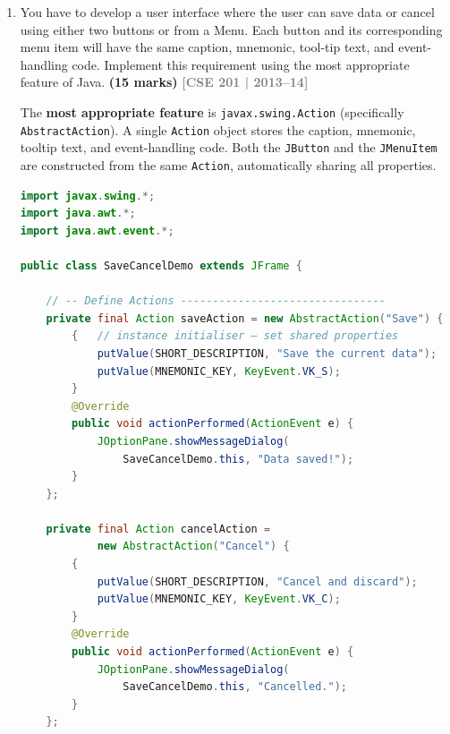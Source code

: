 \documentclass[12pt,a3paper]{article}
\newcommand{\yr}[1]{\hfill\textcolor{gray}{\small\textbf{[#1]}}}
\newcommand{\mk}[1]{\textcolor{orange!70!black}{\small\textbf{(#1 marks)}}}
\begin{document}
\begin{enumerate}
\begin{tcolorbox}[enhanced,breakable,ansbox,
  colback=cC!4,colframe=cC,boxrule=0.8pt,arc=5pt,
  title={\textbf{Answer — Improvements of Swing Over
  AWT}},
  fonttitle=\bfseries\color{white},colbacktitle=cC]
\begin{enumerate}[label=\textbf{\arabic*.}, itemsep=3pt]
  \item \textbf{Accessibility support:} Swing has
  built-in hooks for screen readers and assistive
  technologies via the Java Accessibility API.
\end{enumerate}

\end{tcolorbox}


\item You have to develop a user interface where the user can save data or cancel using either two buttons or from a Menu. Each button and its corresponding menu item will have the same caption, mnemonic, tool-tip text, and event-handling code. Implement this requirement using the most appropriate feature of Java. \mk{15}
\yr{CSE 201 | 2013--14}

\begin{tcolorbox}[enhanced,breakable,ansbox,
  colback=cC!4,colframe=cC,boxrule=0.8pt,arc=5pt,
  title={\textbf{Answer — Save/Cancel Buttons and Menu
  Items Sharing Action}},
  fonttitle=\bfseries\color{white},colbacktitle=cC]

The \textbf{most appropriate feature} is
\texttt{javax.swing.Action} (specifically
\texttt{AbstractAction}). A single \texttt{Action}
object stores the caption, mnemonic, tooltip text,
and event-handling code. Both the \texttt{JButton}
and the \texttt{JMenuItem} are constructed from the
same \texttt{Action}, automatically sharing all
properties.

\begin{lstlisting}[language=Java]
import javax.swing.*;
import java.awt.*;
import java.awt.event.*;

public class SaveCancelDemo extends JFrame {

    // -- Define Actions --------------------------------
    private final Action saveAction = new AbstractAction("Save") {
        {   // instance initialiser — set shared properties
            putValue(SHORT_DESCRIPTION, "Save the current data");
            putValue(MNEMONIC_KEY, KeyEvent.VK_S);
        }
        @Override
        public void actionPerformed(ActionEvent e) {
            JOptionPane.showMessageDialog(
                SaveCancelDemo.this, "Data saved!");
        }
    };

    private final Action cancelAction =
            new AbstractAction("Cancel") {
        {
            putValue(SHORT_DESCRIPTION, "Cancel and discard");
            putValue(MNEMONIC_KEY, KeyEvent.VK_C);
        }
        @Override
        public void actionPerformed(ActionEvent e) {
            JOptionPane.showMessageDialog(
                SaveCancelDemo.this, "Cancelled.");
        }
    };


\end{lstlisting}
\end{tcolorbox}
\end{enumerate}
\end{document}

